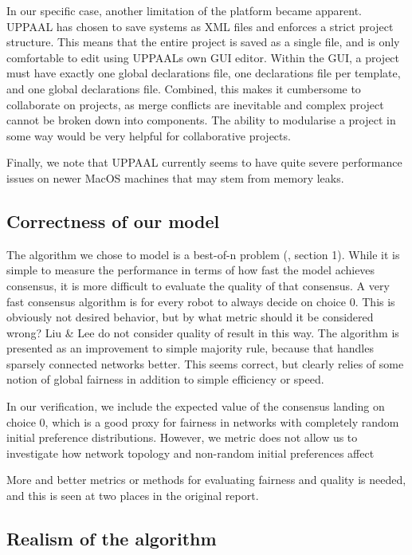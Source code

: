 In our specific case, another limitation of the platform became apparent. 
UPPAAL has chosen to save systems as XML files and enforces a strict project structure.
This means that the entire project is saved as a single file, and is only comfortable to edit using UPPAALs own GUI editor.
Within the GUI, a project must have exactly one global declarations file, one declarations file per template, and one global declarations file.
Combined, this makes it cumbersome to collaborate on projects, as merge conflicts are inevitable and complex project cannot be broken down into components.
The ability to modularise a project in some way would be very helpful for collaborative projects.

Finally, we note that UPPAAL currently seems to have quite severe performance issues on newer MacOS machines that may stem from memory leaks.

\subsection{Correctness of our model}

The algorithm we chose to model is a best-of-n problem (\cite{AlgorithmPaper}, section 1). While it is simple to measure the performance in terms of how fast the model achieves consensus, it is more difficult to evaluate the quality of that consensus.
A very fast consensus algorithm is for every robot to always decide on choice 0. This is obviously not desired behavior, but by what metric should it be considered wrong?
Liu \& Lee do not consider quality of result in this way.
The algorithm is presented as an improvement to simple majority rule, because that handles sparsely connected networks better.
This seems correct, but clearly relies of some notion of global fairness in addition to simple efficiency or speed.

In our verification, we include the expected value of the consensus landing on choice 0, which is a good proxy for fairness in networks with completely random initial preference distributions.
However, we metric does not allow us to investigate how network topology and non-random initial preferences affect 

More and better metrics or methods for evaluating fairness and quality is needed, and this is seen at two places in the original report.



\subsection{Realism of the algorithm}
